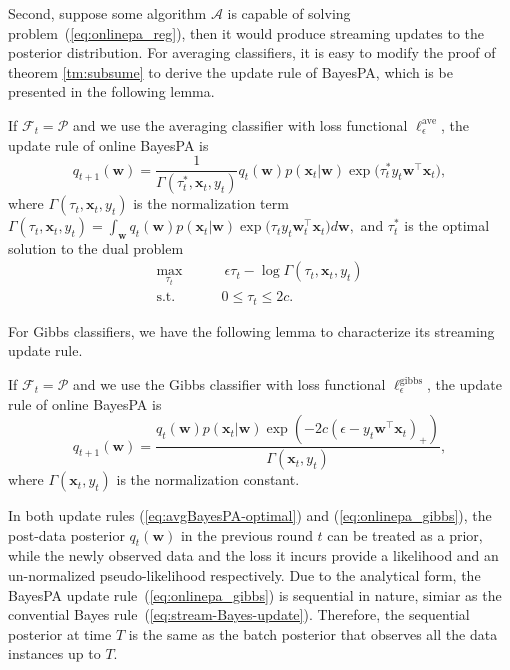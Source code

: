 \documentclass[twoside,11pt]{article}
\newcommand{\xv}{\bm{x}}
\newcommand{\algo}{\mathcal{A}}
\newcommand{\wv}{\bm{w}}
\newcommand{\prob}{\mathcal{P}}
\begin{document}
%
Second, suppose some algorithm $\algo$ is capable of solving problem~(\ref{eq:onlinepa_reg}), then it would produce streaming updates to the posterior distribution. For averaging classifiers, it is easy to modify the proof of theorem \ref{tm:subsume} to derive the update rule of BayesPA, which is be presented in the following lemma.
%
\begin{lemma}\label{lemma:avgBayesPA-Rep}
If $\mathcal{F}_t=\prob$ and we use the averaging classifier with loss functional $\ell_\epsilon^\text{ave}$, the update rule of online BayesPA is
%
\begin{equation}\label{eq:avgBayesPA-optimal}
q_{t+1}(\wv) = \frac{1}{\Gamma(\tau_t^*, \xv_t, y_t)} q_t(\wv) p(\xv_t | \wv) \exp\Big(\tau_t^* y_t \wv^\top \xv_t \Big),
\end{equation}
where $\Gamma(\tau_t, \xv_t, y_t)$ is the normalization term
$%
\Gamma(\tau_t, \xv_t, y_t) = \int_{\wv}{q_t(\wv) p(\xv_t | \wv) \exp \Big(\tau_t y_t \wv_t^\top \xv_t \Big)d\wv},
$ %
and $\tau_t^*$ is the optimal solution to the dual problem
\textnormal{\begin{equation} \nonumber
\begin{array}{rl}
\max\limits_{\tau_t} & ~~~~~~~~~ {~\epsilon\tau_t-\log \Gamma(\tau_t, \xv_t, y_t)} \\
\text{s.t. } & ~~~~~~~~~ 0 \leq \tau_t \leq 2 c .
\end{array}
\end{equation}}
\end{lemma}
For Gibbs classifiers, we have the following lemma to characterize its streaming update rule.
\begin{lemma} \label{lm:pagibbs}
If $\mathcal{F}_t=\prob$ and we use the Gibbs classifier with loss functional  $\ell_\epsilon^{\text{gibbs}}$, the update rule of online BayesPA is
%
\begin{equation}\label{eq:onlinepa_gibbs}
q_{t+1}(\wv) = \frac{q_{t}(\wv) p(\xv_t | \wv) \exp\left( - 2 c \left( \epsilon-y_t \wv^\top \xv_t \right)_+ \right) }{\Gamma(\xv_t, y_t)},
\end{equation}
%
where $\Gamma(\xv_t, y_t)$ is the normalization constant.
\end{lemma}
In both update rules (\ref{eq:avgBayesPA-optimal}) and (\ref{eq:onlinepa_gibbs}), the post-data posterior $q_t(\bm{w})$ in the previous round $t$ can be treated as a prior, while the newly observed data and the loss it incurs provide a likelihood and an un-normalized pseudo-likelihood respectively. Due to the analytical form, the BayesPA update rule~(\ref{eq:onlinepa_gibbs}) is sequential in nature, simiar as the convential Bayes rule~(\ref{eq:stream-Bayes-update}). Therefore, the sequential posterior at time $T$ is the same as the batch posterior that observes all the data instances up to $T$.
\end{document}
